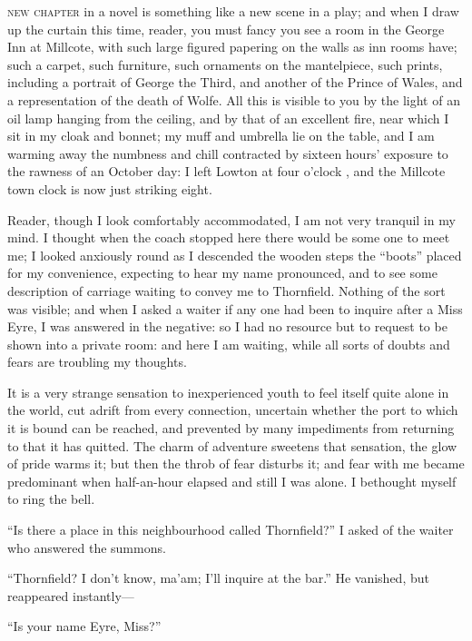 
 \textsc{new chapter} in a novel is something like a new scene in a play; and
when I draw up the curtain this time, reader, you must fancy you see a
room in the George Inn at Millcote, with such large figured papering on
the walls as inn rooms have; such a carpet, such furniture, such
ornaments on the mantelpiece, such prints, including a portrait of
George the Third, and another of the Prince of Wales, and a
representation of the death of Wolfe. All this is visible to you by the
light of an oil lamp hanging from the ceiling, and by that of an
excellent fire, near which I sit in my cloak and bonnet; my muff and
umbrella lie on the table, and I am warming away the numbness and chill
contracted by sixteen hours' exposure to the rawness of an October day:
I left Lowton at four o'clock \AM, and the Millcote town clock is now
just striking eight.

Reader, though I look comfortably accommodated, I am not very tranquil
in my mind. I thought when the coach stopped here there would be some
one to meet me; I looked anxiously round as I descended the wooden steps
the \enquote{boots} placed for my convenience, expecting to hear my name
pronounced, and to see some description of carriage waiting to convey me
to Thornfield. Nothing of the sort was visible; and when I asked a
waiter if any one had been to inquire after a Miss Eyre, I was answered
in the negative: so I had no resource but to request to be shown into a
private room: and here I am waiting, while all sorts of doubts and fears
are troubling my thoughts.

It is a very strange sensation to inexperienced youth to feel itself
quite alone in the world, cut adrift from every connection, uncertain
whether the port to which it is bound can be reached, and prevented by
many impediments from returning to that it has quitted. The charm of
adventure sweetens that sensation, the glow of pride warms it; but then
the throb of fear disturbs it; and fear with me became predominant when
half-an-hour elapsed and still I was alone. I bethought myself to ring
the bell.

\enquote{Is there a place in this neighbourhood called Thornfield?} I
asked of the waiter who answered the summons.

\enquote{Thornfield? I don't know, ma'am; I'll inquire at the bar.} He
vanished, but reappeared instantly---

\enquote{Is your name Eyre, Miss?}

